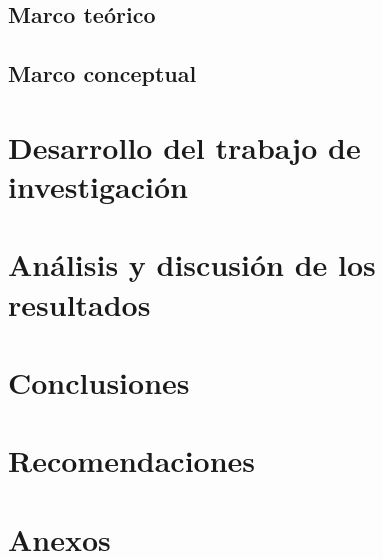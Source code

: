 \documentclass[
  11pt,
  a4paper,
  oneside,
  english,
  spanish
]{TesisUNI}
\begin{document}
\section{Marco teórico}
\section{Marco conceptual}

\chapter{Desarrollo del trabajo de investigación}

\chapter{Análisis y discusión de los resultados}

\chapter{Conclusiones}

\chapter{Recomendaciones}
% 
% 
% 
% 


% 
% 

% 
\chapter*{Anexos}

\renewcommand\listfigurename{\centering Lista de Figuras}
\renewcommand\listtablename{\centering Lista de Tabla}



\end{document}
